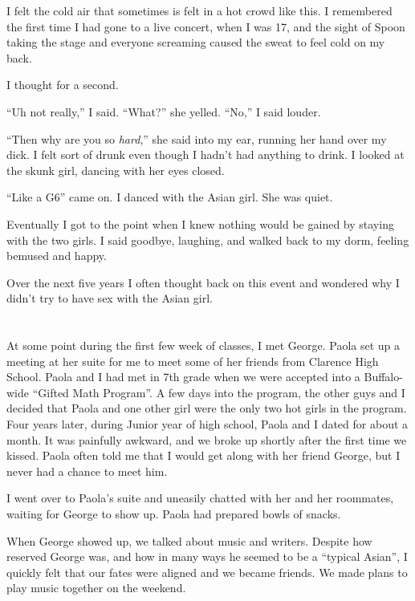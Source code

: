 I felt the cold air that sometimes is felt in a hot crowd like this.  I
remembered the first time I had gone to a live concert, when I was 17, and the
sight of Spoon taking the stage and everyone screaming caused the sweat to feel
cold on my back.

I thought for a second.

``Uh not really,'' I said.  ``What?'' she yelled.  ``No,'' I said louder.

``Then why are you so \textit{hard},'' she said into my ear, running her hand
over my dick.  I felt sort of drunk even though I hadn't had anything to drink.
I looked at the skunk girl, dancing with her eyes closed.  

``Like a G6'' came on.  I danced with the Asian girl.  She was quiet.

Eventually I got to the point when I knew nothing would be gained by staying
with the two girls.  I said goodbye, laughing, and walked back to my dorm,
feeling bemused and happy. 

Over the next five years I often thought back on this event and wondered why I
didn't try to have sex with the Asian girl.  

\section{}

At some point during the first few week of classes, I met George.  Paola set up
a meeting at her suite for me to meet some of her friends from Clarence High
School.  Paola and I had met in 7th grade when we were accepted into a
Buffalo-wide ``Gifted Math Program''.  A few days into the program, the other
guys and I decided that Paola and one other girl were the only two hot girls in
the program.  Four years later, during Junior year of high school, Paola and I
dated for about a month.  It was painfully awkward, and we broke up shortly
after the first time we kissed.  Paola often told me that I would get along with
her friend George, but I never had a chance to meet him. 

I went over to Paola's suite and uneasily chatted with her and her
roommates, waiting for George to show up.  Paola had prepared bowls of snacks.

When George showed up, we talked about music and writers.  Despite how reserved
George was, and how in many ways he seemed to be a ``typical Asian'', I quickly
felt that our fates were aligned and we became friends.  We made plans to play
music together on the weekend.

